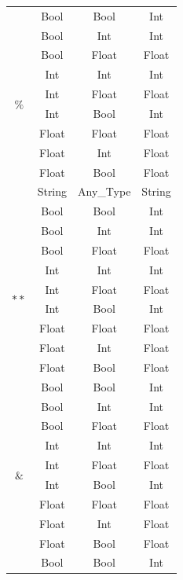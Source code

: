 \documentclass[12pt, titlepage]{article}
\begin{document}
\begin{longtable}{ |c |c |c |c | }
	                     & Bool & Bool & Int \\
	                     & Bool & Int & Int \\
	                     & Bool & Float & Float \\
	                     \hline
	\multirow{4}{*}{$\%$} & Int & Int & Int \\
	                     & Int & Float & Float \\
	                     & Int & Bool & Int \\
	                     & Float & Float & Float \\
	                     & Float & Int & Float \\
	                     & Float & Bool & Float \\
	                     & String & Any\_Type & String \\ 
	                     & Bool & Bool & Int \\
	                     & Bool & Int & Int \\
	                     & Bool & Float & Float \\   
	                     \hline 
	\multirow{4}{*}{$**$} & Int & Int & Int \\
	                     & Int & Float & Float \\
	                     & Int & Bool & Int \\
	                     & Float & Float & Float \\
	                     & Float & Int & Float \\
	                     & Float & Bool & Float \\
	                     & Bool & Bool & Int \\
	                     & Bool & Int & Int \\
	                     & Bool & Float & Float \\  
	                      \hline 
	\multirow{4}{*}{$\&$} & Int & Int & Int \\
	                     & Int & Float & Float \\
	                     & Int & Bool & Int \\
	                     & Float & Float & Float \\
	                     & Float & Int & Float \\
	                     & Float & Bool & Float \\
	                     & Bool & Bool & Int \\

\end{longtable}
\end{document}
